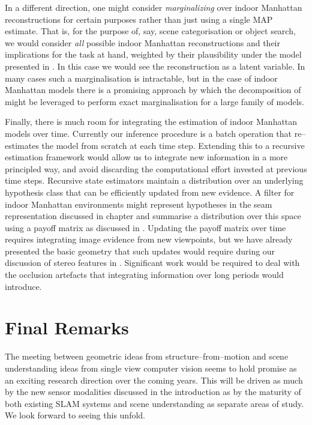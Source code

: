 In a different direction, one might consider \textit{marginalizing}
over indoor Manhattan reconstructions for certain purposes rather than
just using a single MAP estimate. That is, for the purpose of, say,
scene categorisation or object search, we would consider \textit{all}
possible indoor Manhattan reconstructions and their implications for
the task at hand, weighted by their plausibility under the model
presented in . In this case we would see the
reconstruction as a latent variable. In many cases such a
marginalisation is intractable, but in the case of indoor Manhattan
models there is a promising approach by which the decomposition of
 might be leveraged to perform exact
marginalisation for a large family of models.

Finally, there is much room for integrating the estimation of indoor
Manhattan models over time. Currently our inference procedure is a
batch operation that re--estimates the model from scratch at each time
step. Extending this to a recursive estimation framework would allow
us to integrate new information in a more principled way, and avoid
discarding the computational effort invested at previous time
steps. Recursive state estimators maintain a distribution over an
underlying hypothesis class that can be efficiently updated from new
evidence. A filter for indoor Manhattan environments might represent
hypotheses in the seam representation discussed in chapter
 and summarise a distribution over this space using
a payoff matrix as discussed in . Updating the
payoff matrix over time requires integrating image evidence from new
viewpoints, but we have already presented the basic geometry that such
updates would require during our discussion of stereo features in
. Significant work would be required to deal with
the occlusion artefacts that integrating information over long periods
would introduce.

\section{Final Remarks}

The meeting between geometric ideas from structure--from--motion and
scene understanding ideas from single view computer vision seems to
hold promise as an exciting research direction over the coming
years. This will be driven as much by the new sensor modalities
discussed in the introduction as by the maturity of both existing
SLAM systems and scene understanding as separate areas of study. We
look forward to seeing this unfold.


